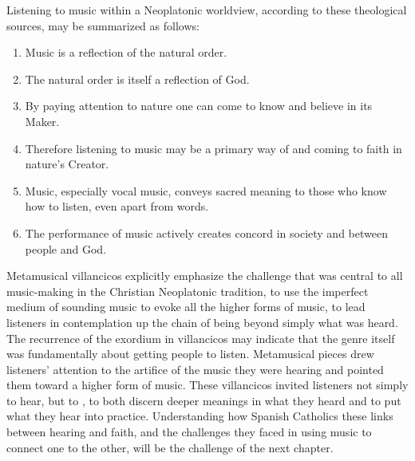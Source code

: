 Listening to music within a Neoplatonic worldview, according to these
theological sources, may be summarized as follows:
\begin{enumerate}
\item Music is a reflection of the natural order.
\item The natural order is itself a reflection of God.
\item By paying attention to nature one can come to know and believe in its
    Maker.
\item Therefore listening to music may be a primary way of  and coming to faith in nature's Creator.
\item Music, especially vocal music, conveys sacred meaning to those who know
    how to listen, even apart from words.
\item The performance of music actively creates concord in society and between
    people and God.  
\end{enumerate}

Metamusical villancicos explicitly emphasize the challenge that was central to
all music-making in the Christian Neoplatonic tradition, to use the imperfect
medium of sounding music to evoke all the higher forms of music, to lead
listeners in contemplation up the chain of being beyond simply what was heard.
The recurrence of the  exordium in villancicos may indicate
that the genre itself was fundamentally about getting people to listen.
Metamusical pieces drew listeners' attention to the artifice of the music they
were hearing and pointed them toward a higher form of music.
These villancicos invited listeners not simply to hear, but to , to both discern deeper meanings in what they heard and to
put what they hear into practice.
Understanding how Spanish Catholics these links between hearing and faith, and
the challenges they faced in using music to connect one to the other, will be
the challenge of the next chapter.

\endinput
